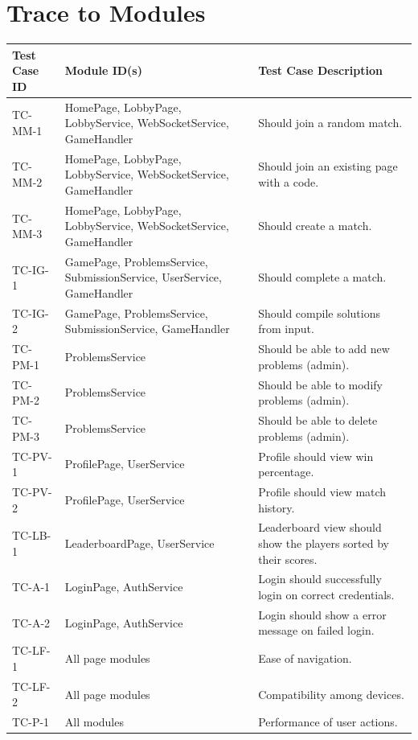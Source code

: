 \documentclass[12pt, titlepage]{article}
\begin{document}
\section{Trace to Modules}
\begin{longtable}{| p{2.5cm} | p{5cm} | p{6cm}| }
    \hline
    Test Case ID & Module ID(s) & Test Case Description\\
    \hline
    TC-MM-1 & HomePage, LobbyPage, LobbyService, WebSocketService, GameHandler & Should join a random match.\\
    \hline
    TC-MM-2 &  HomePage, LobbyPage, LobbyService, WebSocketService, GameHandler & Should join an existing page with a code. \\
     \hline
    TC-MM-3 &  HomePage, LobbyPage, LobbyService, WebSocketService, GameHandler & Should create a match. \\
     \hline
    TC-IG-1 & GamePage, ProblemsService, SubmissionService, UserService, GameHandler & Should complete a match. \\
     \hline
    TC-IG-2 & GamePage, ProblemsService, SubmissionService, GameHandler & Should compile solutions from input.\\
     \hline
    TC-PM-1 & ProblemsService & Should be able to add new problems (admin).\\
     \hline
    TC-PM-2 & ProblemsService & Should be able to modify problems (admin).\\
     \hline
    TC-PM-3 & ProblemsService & Should be able to delete problems (admin).\\
     \hline
    TC-PV-1 & ProfilePage, UserService & Profile should view win percentage.\\
     \hline
    TC-PV-2 &  ProfilePage, UserService & Profile should view match history.\\
     \hline
    TC-LB-1 & LeaderboardPage, UserService & Leaderboard view should show the players sorted by their scores.\\
     \hline
     TC-A-1 & LoginPage, AuthService & Login should successfully login on correct credentials.\\
     \hline
     TC-A-2 & LoginPage, AuthService & Login should show a error message on failed login.\\
     \hline
    TC-LF-1 & All page modules & Ease of navigation.\\
    \hline
    TC-LF-2 & All page modules  & Compatibility among devices.\\
    \hline
     TC-P-1 & All modules & Performance of user actions.\\

\end{longtable}
\end{document}

